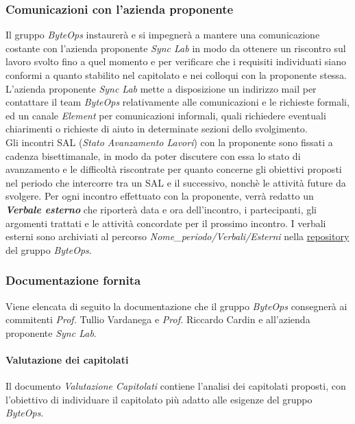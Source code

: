 \subsubsection{Comunicazioni con l'azienda proponente}
Il gruppo \textit{ByteOps} instaurerà e si impegnerà a mantere una comunicazione costante con l'azienda proponente \textit{Sync Lab} in modo da ottenere un riscontro sul lavoro svolto fino a quel momento e per verificare che i requisiti individuati siano conformi a quanto stabilito nel capitolato e nei colloqui con la proponente stessa.\\
L'azienda proponente \textit{Sync Lab} mette a disposizione un indirizzo mail per contattare il team \textit{ByteOps} relativamente alle comunicazioni e le richieste formali, ed un canale \textit{Element} per comunicazioni informali, quali richiedere eventuali chiarimenti o richieste di aiuto in determinate sezioni dello svolgimento.\\
Gli incontri SAL (\textit{Stato Avanzamento Lavori}) con la proponente sono fissati a cadenza bisettimanale, in modo da poter discutere con essa lo stato di avanzamento e le difficoltà riscontrate per quanto concerne gli obiettivi proposti nel periodo che intercorre tra un SAL e il successivo, nonchè le attività future da svolgere.
Per ogni incontro effettuato con la proponente, verrà redatto un \textit{\textbf{Verbale esterno}} che riporterà data e ora dell'incontro, i partecipanti, gli argomenti trattati e le attività concordate per il prossimo incontro.
I verbali esterni sono archiviati al percorso \textit{Nome\_periodo/Verbali/Esterni} nella \href{https://github.com/ByteOps-swe/Documents}{repository} del gruppo \textit{ByteOps}.

\subsubsection {Documentazione fornita}
Viene elencata di seguito la documentazione che il gruppo \textit{ByteOps} consegnerà ai commitenti \textit{Prof.} Tullio Vardanega e \textit{Prof.} Riccardo Cardin e all'azienda proponente \textit{Sync Lab}.

\paragraph{Valutazione dei capitolati}
Il documento \textit{Valutazione Capitolati} contiene l'analisi dei capitolati proposti, con l'obiettivo di individuare il capitolato più adatto alle esigenze del gruppo \textit{ByteOps}. 

